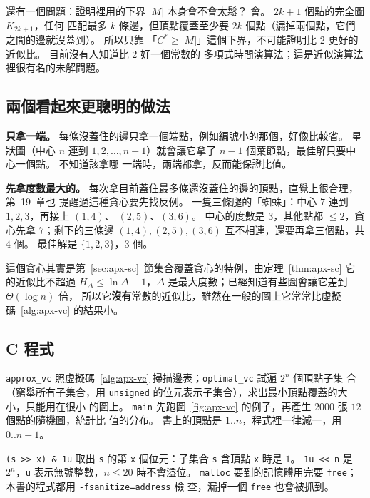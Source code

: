 還有一個問題：證明裡用的下界 $|M|$ 本身會不會太鬆？ 會。 $2k+1$ 個點的完全圖 $K_{2k+1}$，任何
匹配最多 $k$ 條邊，但頂點覆蓋至少要 $2k$ 個點（漏掉兩個點，它們之間的邊就沒蓋到）。 所以只靠
「$C^* \ge |M|$」這個下界，不可能證明比 $2$ 更好的近似比。 目前沒有人知道比 $2$ 好一個常數的
多項式時間演算法；這是近似演算法裡很有名的未解問題。

\subsection{兩個看起來更聰明的做法}

\textbf{只拿一端。} 每條沒蓋住的邊只拿一個端點，例如編號小的那個，好像比較省。 星狀圖（中心
$n$ 連到 $1, 2, \ldots, n-1$）就會讓它拿了 $n - 1$ 個葉節點，最佳解只要中心一個點。 不知道該拿哪
一端時，兩端都拿，反而能保證比值。

\textbf{先拿度數最大的。} 每次拿目前蓋住最多條還沒蓋住的邊的頂點，直覺上很合理，第~19~章也
提醒過這種貪心要先找反例。 一隻三條腿的「蜘蛛」：中心 $7$ 連到 $1, 2, 3$，再接上 $(1,4)$、
$(2,5)$、$(3,6)$。 中心的度數是 $3$，其他點都 $\le 2$，貪心先拿 $7$；剩下的三條邊 $(1,4), (2,5), (3,6)$ 互不相連，還要再拿三個點，共
$4$ 個。 最佳解是 $\{1, 2, 3\}$，$3$ 個。

這個貪心其實是第~\ref{sec:apx-sc}~節集合覆蓋貪心的特例，由定理~\ref{thm:apx-sc} 它的近似比不超過
$H_\Delta \le \ln \Delta + 1$，$\Delta$ 是最大度數；已經知道有些圖會讓它差到 $\Theta(\log n)$ 倍，
所以它\textbf{沒有}常數的近似比，雖然在一般的圖上它常常比虛擬碼~\ref{alg:apx-vc} 的結果小。

\subsection{C 程式}

\texttt{approx\_vc} 照虛擬碼~\ref{alg:apx-vc} 掃描邊表；\texttt{optimal\_vc} 試遍 $2^n$ 個頂點子集
合（窮舉所有子集合，用 \texttt{unsigned} 的位元表示子集合），求出最小頂點覆蓋的大小，只能用在很小
的圖上。 \texttt{main} 先跑圖~\ref{fig:apx-vc} 的例子，再產生 $2000$ 張 $12$ 個點的隨機圖，統計比
值的分布。 書上的頂點是 $1..n$，程式裡一律減一，用 $0..n-1$。

\begin{cbookrecap}[第~12~章位元運算、第~19~章 19.3 節]
\texttt{(s >> x) \& 1u} 取出 \texttt{s} 的第 \texttt{x} 個位元：子集合 \texttt{s} 含頂點
\texttt{x} 時是 $1$。 \texttt{1u << n} 是 $2^n$，\texttt{u} 表示無號整數，$n \le 20$ 時不會溢位。
\texttt{malloc} 要到的記憶體用完要 \texttt{free}；本書的程式都用 \texttt{-fsanitize=address} 檢
查，漏掉一個 \texttt{free} 也會被抓到。
\end{cbookrecap}

